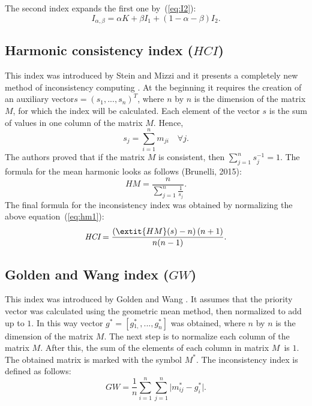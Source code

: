 The second index expands the first one by~(\ref{eq:I2}):
	\begin{equation} 
		I_{\alpha,\beta}=\alpha K+\beta I_{1}+(1-\alpha-\beta)I_{2}.
	 \end{equation}
 

\subsection{Harmonic consistency index ($\textit{HCI}$)}

This index was introduced by Stein and Mizzi and it presents a completely new method of inconsistency computing \cite{STEIN2007}. At the beginning it requires the creation of an auxiliary vector\newline$s=(s_{1},...,s_{n})^{T}$, where $n$ by $n$ is the dimension of the matrix $M$, for which the index will be calculated. Each element of the vector $s$ is the sum of values in one column of the matrix $M$. Hence, 
	\begin{equation} 
		s_{j}=\sum_{i=1}^{n}m_{ji}\,\,\,\,\,\,\forall j.
	 \end{equation}
 The authors proved that if the matrix $M$ is consistent, then $\sum_{j=1}^{n}s_{j}^{-1}=1$. The formula for the mean harmonic looks as follows (Brunelli, 2015):
	 \begin{equation} 
		\label{eq:hm1}
		\textit{HM}=\frac{n}{\sum_{j=1}^{n}\frac{1}{s_{j}}}.
	 \end{equation}
 The final formula for the inconsistency index was obtained by normalizing the above equation~(\ref{eq:hm1}):
 	\begin{equation} 
		\textit{HCI}=\frac{\left(\extit{HM}(s)-n\right)\left(n+1\right)}{n(n-1)}.
	 \end{equation}
 

\subsection{Golden and Wang index ($\textit{GW}$)}

This index was introduced by Golden and Wang \cite{Golden1989}. It assumes that the priority vector was calculated using the geometric mean method, then normalized to add up to $1$. In this way vector $g^{*}=[g{}_{1,}^{*},...,g_{n}^{*}]$ was obtained, where $n$ by $n$ is the dimension of the matrix $M$. The next step is to normalize each column of the matrix $M$. After this, the sum of the elements of each column in matrix $M$~is $1$. The obtained matrix is marked with the symbol $M^{*}$. The inconsistency index is defined as follows:
	\begin{equation} 
		\textit{GW}=\frac{1}{n}\sum_{i=1}^{n}\sum_{j=1}^{n}\bigl\vert m_{ij}^{*}-g_{i}^{*}\bigr\vert.
	 \end{equation}
 

